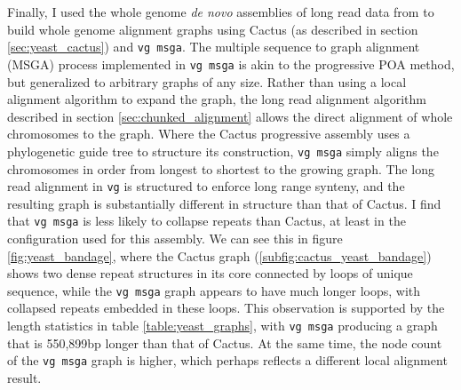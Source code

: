 Finally, I used the whole genome \emph{de novo} assemblies of long read data from \cite{yue2017contrasting} to build whole genome alignment graphs using Cactus (as described in section \ref{sec:yeast_cactus}) and {\tt vg msga}.
The multiple sequence to graph alignment (MSGA) process implemented in {\tt vg msga} is akin to the progressive POA method, but generalized to arbitrary graphs of any size.
Rather than using a local alignment algorithm to expand the graph, the long read alignment algorithm described in section \ref{sec:chunked_alignment} allows the direct alignment of whole chromosomes to the graph.
Where the Cactus progressive assembly uses a phylogenetic guide tree to structure its construction, {\tt vg msga} simply aligns the chromosomes in order from longest to shortest to the growing graph.
The long read alignment in {\tt vg} is structured to enforce long range synteny, and the resulting graph is substantially different in structure than that of Cactus.
I find that {\tt vg msga} is less likely to collapse repeats than Cactus, at least in the configuration used for this assembly.
We can see this in figure \ref{fig:yeast_bandage}, where the Cactus graph (\ref{subfig:cactus_yeast_bandage}) shows two dense repeat structures in its core connected by loops of unique sequence, while the {\tt vg msga} graph appears to have much longer loops, with collapsed repeats embedded in these loops.
This observation is supported by the length statistics in table \ref{table:yeast_graphs}, with {\tt vg msga} producing a graph that is 550,899bp longer than that of Cactus.
At the same time, the node count of the {\tt vg msga} graph is higher, which perhaps reflects a different local alignment result.

